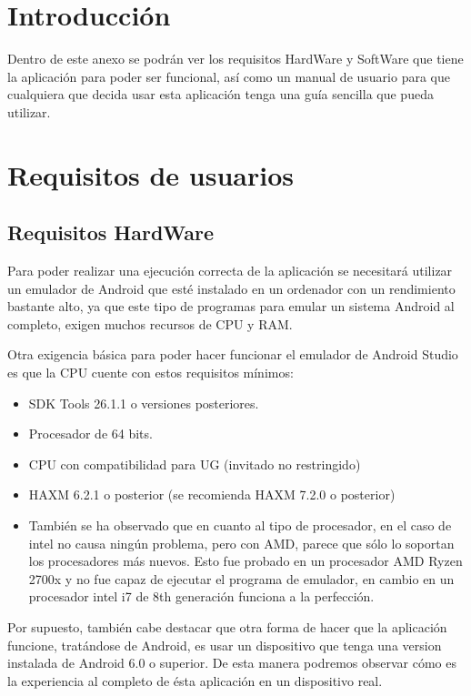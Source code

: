 
\section{Introducción}

Dentro de este anexo se podrán ver los requisitos HardWare y SoftWare que tiene la aplicación para poder ser funcional, así como un manual de usuario para que cualquiera que decida usar esta aplicación tenga una guía sencilla que pueda utilizar.

\section{Requisitos de usuarios}

\subsection{Requisitos HardWare}

Para poder realizar una ejecución correcta de la aplicación se necesitará utilizar un emulador de Android que esté instalado en un ordenador con un rendimiento bastante alto, ya que este tipo de programas para emular un sistema Android al completo, exigen muchos recursos de CPU y RAM.

Otra exigencia básica para poder hacer funcionar el emulador de Android Studio es que la CPU cuente con estos requisitos mínimos:

\begin{itemize}
\item SDK Tools 26.1.1 o versiones posteriores.
\item Procesador de 64 bits.
\item CPU con compatibilidad para UG (invitado no restringido)
\item HAXM 6.2.1 o posterior (se recomienda HAXM 7.2.0 o posterior)
\item También se ha observado que en cuanto al tipo de procesador, en el caso de intel no causa ningún problema, pero con AMD, parece que sólo lo soportan los procesadores más nuevos. Esto fue probado en un procesador AMD Ryzen 2700x y no fue capaz de ejecutar el programa de emulador, en cambio en un procesador intel i7 de 8th generación funciona a la perfección.
\end{itemize}

Por supuesto, también cabe destacar que otra forma de hacer que la aplicación funcione, tratándose de Android, es usar un dispositivo que tenga una version instalada de Android 6.0 o superior. De esta manera podremos observar cómo es la experiencia al completo de ésta aplicación en un dispositivo real. 

